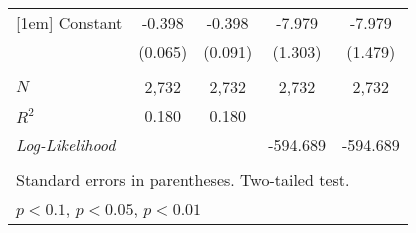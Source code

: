 \documentclass[12pt,a4paper]{article}
\begin{document}
\begin{table}
{\begin{tabular}{l*{4}{c}}
[1em]
Constant      &      -0.398\sym{***}&      -0.398\sym{***}&      -7.979\sym{***}&      -7.979\sym{***}\\
            &    (0.065)         &    (0.091)         &     (1.303)         &     (1.479)         \\
\hline\\[-1.8ex] 
\(N\)       &        2,732         &        2,732         &        2,732         &        2,732         \\
\(R^{2}\)   &       0.180         &       0.180         &                     &                     \\
\textit{Log-Likelihood} &   &  &   -594.689  & -594.689 \\
\hline\hline\\[-1.8ex] 
\multicolumn{5}{l}{\footnotesize Standard errors in parentheses. Two-tailed test.}\\
\multicolumn{5}{l}{\footnotesize \sym{*} \(p<0.1\), \sym{**} \(p<0.05\), \sym{***} \(p<0.01\)}\\
\end{tabular}
}
\end{table}

\end{document}

